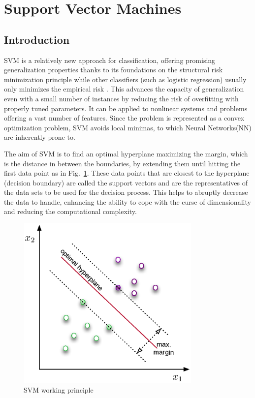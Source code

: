 \section{Support Vector Machines}

\subsection{Introduction}

SVM is a relatively new approach for classification, offering promising generalization properties thanks to its foundations on the structural risk minimization principle while other classifiers (such as logistic regression) usually only minimizes the empirical risk \cite{gunn1998support,yin2014study}. 
This advances the capacity of generalization even with a small number of instances by reducing the risk of overfitting with properly tuned parameters. 
It can be applied to nonlinear systems and problems offering a vast number of features. 
Since the problem is represented as a convex optimization problem, SVM avoids local minimas, to which Neural Networks(NN) are inherently prone to.

The aim of SVM is to find an optimal hyperplane maximizing the margin, which is the distance in between the boundaries, by extending them until hitting the first data point as in Fig.~\ref{fig:svmHyperplane}. These data points that are closest to the hyperplane (decision boundary) are called the support vectors and are the representatives of the data sets to be used for the decision process. This helps to abruptly decrease the data to handle, enhancing the ability to cope with the curse of dimensionality and reducing the computational complexity.

\begin{figure}
\begin{center}
\includegraphics[width=9cm]{figures/svmHyperplane}    %
\caption{SVM working principle} 
\label{fig:svmHyperplane}
\end{center}
\end{figure}

